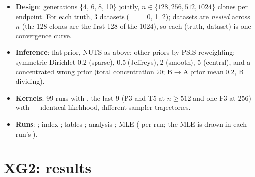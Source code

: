 \documentclass[10pt,a4paper]{article}
\newcommand{\BA}{B$\to$A}
\begin{document}
\begin{itemize}
\item \textbf{Design}: generations \{4, 6, 8, 10\} jointly, $n \in \{128, 256, 512, 1024\}$ clones per endpoint. For each truth, 3 datasets ( =  = 0, 1, 2); datasets are \emph{nested} across $n$ (the 128 clones are the first 128 of the 1024), so each (truth, dataset) is one convergence curve.
\item \textbf{Inference}: flat prior, NUTS as above; other priors by PSIS reweighting: symmetric Dirichlet 0.2 (sparse), 0.5 (Jeffreys), 2 (smooth), 5 (central), and a concentrated wrong prior (total concentration 20; \BA{} prior mean 0.2, B dividing).
\item \textbf{Kernels}: 99 runs with , the last 9 (P3 and T5 at $n \ge 512$ and one P3 at 256) with  --- identical likelihood, different sampler trajectories.
\item \textbf{Runs}: ; index ; tables ; analysis ; MLE  ( per run; the MLE is drawn in each run's ).
\end{itemize}

\section{XG2: results}\label{sec:xg2results}
\end{document}
